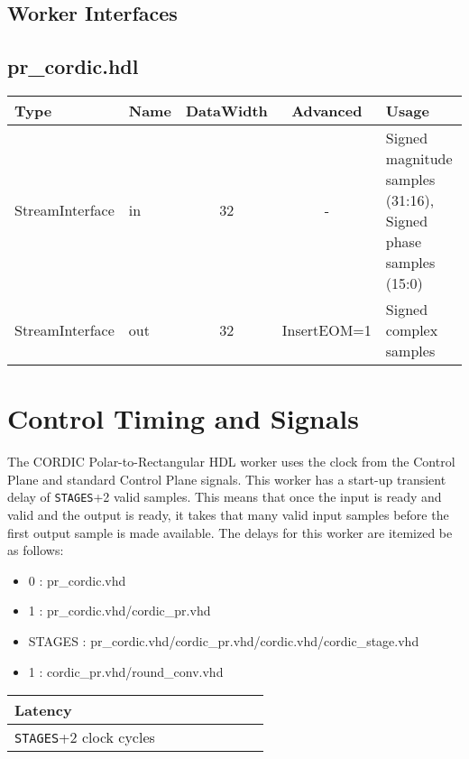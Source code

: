 \documentclass{article}
\def\comp{pr\_cordic}
\begin{document}
\begin{landscape}
	\section*{Worker Interfaces}
	\subsection*{\comp.hdl}
	\begin{scriptsize}
		\begin{tabular}{|M{2cm}|M{1.5cm}|c|c|M{12cm}|}
			\hline
			Type            & Name & DataWidth & Advanced 					 & Usage                  \\
			\hline
			StreamInterface & in   & 32        & - & Signed magnitude samples (31:16), Signed phase samples (15:0) \\
			\hline
			StreamInterface & out  & 32        & InsertEOM=1 & Signed complex samples \\
			\hline
		\end{tabular}
	\end{scriptsize}
\end{landscape}

\section*{Control Timing and Signals}
The CORDIC Polar-to-Rectangular HDL worker uses the clock from the Control Plane and standard Control Plane signals. This worker has a start-up transient delay of \verb+STAGES++2 valid samples. This means that once the input is ready and valid and the output is ready, it takes that many valid input samples before the first output sample is made available. The delays for this worker are itemized be as follows:
\begin{itemize}
	\item 0 : pr\_cordic.vhd
	\item 1 : pr\_cordic.vhd/cordic\_pr.vhd
	\item STAGES : pr\_cordic.vhd/cordic\_pr.vhd/cordic.vhd/cordic\_stage.vhd
	\item 1 : cordic\_pr.vhd/round\_conv.vhd
\end{itemize}

\begin{tabular}{|M{4.5cm}|M{1cm}|M{1cm}|M{1.5cm}|M{2cm}|M{1cm}|M{1cm}|M{2.5cm}|}
	\hline
	Latency                      \\
	\hline
	\verb+STAGES++2 clock cycles \\
	\hline
\end{tabular}
\end{document}

